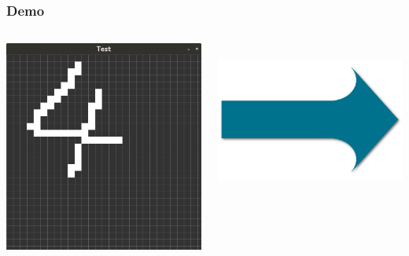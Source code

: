 \documentclass[xcolor=pdftex,dvipsnames,table]{beamer}
\begin{document}
\begin{frame}
	\frametitle{Demo}
	\begin{columns}
		\begin{column}{0.25\textwidth}
			\includegraphics[width=1\textwidth, interpolate=true]{4_drawn.png}
		\end{column}
		\begin{column}{0.05\textwidth}
			\\
			\includegraphics[width=1\textwidth]{arrow.png}\\

\end{column}
\end{columns}
\end{frame}
\end{document}
